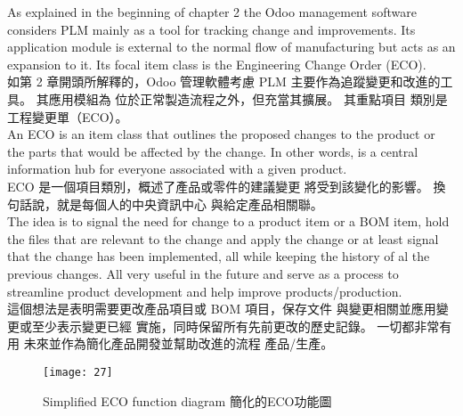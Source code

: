 \fontsize{12}{2.5pt}\sectionef 
 {As explained in the beginning of chapter 2 the Odoo management software considers
PLM mainly as a tool for tracking change and improvements. Its application module is
external to the normal flow of manufacturing but acts as an expansion to it. Its focal item
class is the Engineering Change Order (ECO). }\\[1pt]

\fontsize{12}{2.5pt}\sectionef  
{如第 2 章開頭所解釋的，Odoo 管理軟體考慮
PLM 主要作為追蹤變更和改進的工具。 其應用模組為
位於正常製造流程之外，但充當其擴展。 其重點項目
類別是工程變更單（ECO）。}\\[15pt]



\fontsize{12}{2.5pt}\sectionef 
 {An ECO is an item class that outlines the proposed changes to the product or the parts that
would be affected by the change. In other words, is a central information hub for everyone
associated with a given product. }\\[1pt]

\fontsize{12}{2.5pt}\sectionef  
{ECO 是一個項目類別，概述了產品或零件的建議變更
將受到該變化的影響。 換句話說，就是每個人的中央資訊中心
與給定產品相關聯。}\\[15pt]


\fontsize{12}{2.5pt}\sectionef 
 {The idea is to signal the need for change to a product item or a BOM item, hold the files
that are relevant to the change and apply the change or at least signal that the change has been
implemented, all while keeping the history of al the previous changes. All very useful in the
future and serve as a process to streamline product development and help improve
products/production.}\\[1pt]

\fontsize{12}{2.5pt}\sectionef  
{這個想法是表明需要更改產品項目或 BOM 項目，保存文件
與變更相關並應用變更或至少表示變更已經
實施，同時保留所有先前更改的歷史記錄。 一切都非常有用
未來並作為簡化產品開發並幫助改進的流程
產品/生產。}\\[15pt]



\begin{figure}[hbt!]
\begin{center}
\texttt{[image: 27]}
\caption{\Large Simplified ECO function diagram 簡化的ECO功能圖}\label{fig.27}
\end{center}
\end{figure}